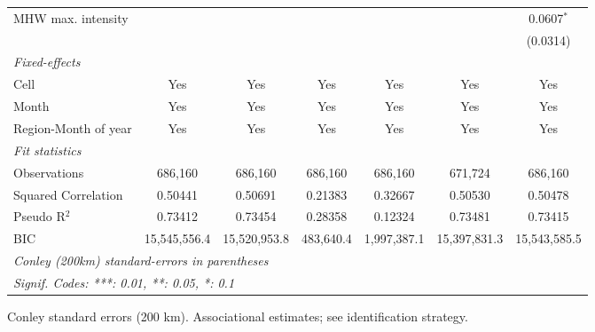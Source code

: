 \begin{table}[htbp]
\begin{tabular}{lcccccc}
      MHW max. intensity   &              &                 &           &               &                 & 0.0607$^{*}$\\   
                           &              &                 &           &               &                 & (0.0314)\\   
      \midrule
      \emph{Fixed-effects}\\
      Cell                 & Yes          & Yes             & Yes       & Yes           & Yes             & Yes\\  
      Month                & Yes          & Yes             & Yes       & Yes           & Yes             & Yes\\  
      Region-Month of year & Yes          & Yes             & Yes       & Yes           & Yes             & Yes\\  
      \midrule
      \emph{Fit statistics}\\
      Observations         & 686,160      & 686,160         & 686,160   & 686,160       & 671,724         & 686,160\\  
      Squared Correlation  & 0.50441      & 0.50691         & 0.21383   & 0.32667       & 0.50530         & 0.50478\\  
      Pseudo R$^2$         & 0.73412      & 0.73454         & 0.28358   & 0.12324       & 0.73481         & 0.73415\\  
      BIC                  & 15,545,556.4 & 15,520,953.8    & 483,640.4 & 1,997,387.1   & 15,397,831.3    & 15,543,585.5\\  
      \midrule \midrule
      \multicolumn{7}{l}{\emph{Conley (200km) standard-errors in parentheses}}\\
      \multicolumn{7}{l}{\emph{Signif. Codes: ***: 0.01, **: 0.05, *: 0.1}}\\
   \end{tabular}
   
   \par \raggedright 
   Conley standard errors (200 km). Associational estimates; see identification strategy.
\end{table}


